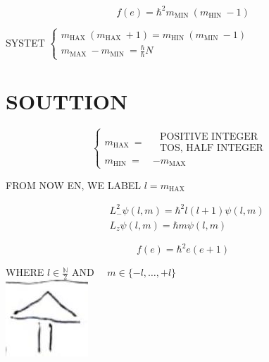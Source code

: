 \documentclass[10pt]{article}
\begin{document}
$$
f(e)=\hbar^{2} m_{\text {MIN }}\left(m_{\text {HIN }}-1\right)
$$

SYSTET $\left\{\begin{array}{l}m_{\text {HAX }}\left(m_{\text {HAX }}+1\right)=m_{\text {HIN }}\left(m_{\text {MIN }}-1\right) \\ m_{\text {MAX }}-m_{\text {MIN }}=\frac{\hbar}{\hbar} N\end{array}\right.$

\section*{SOUTTION}
$$
\left\{\begin{aligned}
m_{\text {HAX }}= & \begin{array}{r}
\text { POSITIVE INTEGER } \\
\text { TOS, HALF INTEGER }
\end{array} \\
m_{\text {HIN }}= & -m_{\text {MAX }}
\end{aligned}\right.
$$

FROM NOW EN, WE LABEL $l=m_{\text {HAX }}$

$$
\begin{aligned}
& L_{-}^{2} \psi(l, m)=\hbar^{2} l(l+1) \psi(l, m) \\
& L_{z} \psi(l, m)=\hbar m \psi(l, m)
\end{aligned}
$$

$$
f(e)=\hbar^{2} e(e+1)
$$

WHERE $l \in \frac{\mathbb{N}}{2}$ AND $\quad m \in\{-l, \ldots,+l\}$\\
\includegraphics[max width=\textwidth, center]{2025_10_16_22329e0f50bdd2511b17g-05}
\end{document}
